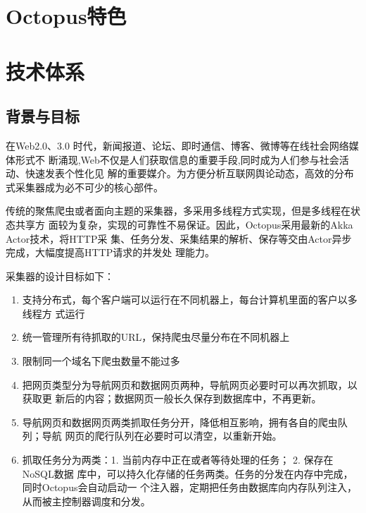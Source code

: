 \section{Octopus特色}



\section{技术体系}

\subsection{背景与目标}

在Web2.0、3.0 时代，新闻报道、论坛、即时通信、博客、微博等在线社会网络媒体形式不
断涌现,Web不仅是人们获取信息的重要手段,同时成为人们参与社会活动、快速发表个性化见
解的重要媒介。为方便分析互联网舆论动态，高效的分布式采集器成为必不可少的核心部件。

传统的聚焦爬虫或者面向主题的采集器，多采用多线程方式实现，但是多线程在状态共享方
面较为复杂，实现的可靠性不易保证。因此，Octopus采用最新的Akka Actor技术，将HTTP采
集、任务分发、采集结果的解析、保存等交由Actor异步完成，大幅度提高HTTP请求的并发处
理能力。

采集器的设计目标如下：

\begin{enumerate}
\item 支持分布式，每个客户端可以运行在不同机器上，每台计算机里面的客户以多线程方
  式运行

\item 统一管理所有待抓取的URL，保持爬虫尽量分布在不同机器上

\item 限制同一个域名下爬虫数量不能过多

\item 把网页类型分为导航网页和数据网页两种，导航网页必要时可以再次抓取，以获取更
  新后的内容；数据网页一般长久保存到数据库中，不再更新。

\item 导航网页和数据网页两类抓取任务分开，降低相互影响，拥有各自的爬虫队列；导航
  网页的爬行队列在必要时可以清空，以重新开始。

\item 抓取任务分为两类：1. 当前内存中正在或者等待处理的任务； 2. 保存在NoSQL数据
  库中，可以持久化存储的任务两类。任务的分发在内存中完成，同时Octopus会自动启动一
  个注入器，定期把任务由数据库向内存队列注入，从而被主控制器调度和分发。
\end{enumerate}

